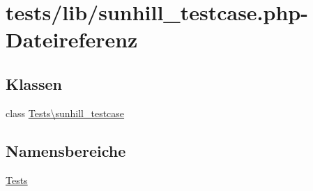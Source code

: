 \hypertarget{sunhill__testcase_8php}{}\section{tests/lib/sunhill\+\_\+testcase.php-\/\+Dateireferenz}
\label{sunhill__testcase_8php}
\subsection*{Klassen}
\begin{DoxyCompactItemize}
\item 
class \hyperlink{classTests_1_1sunhill__testcase}{Tests\textbackslash{}sunhill\+\_\+testcase}
\end{DoxyCompactItemize}
\subsection*{Namensbereiche}
\begin{DoxyCompactItemize}
\item 
 \hyperlink{namespaceTests}{Tests}
\end{DoxyCompactItemize}
